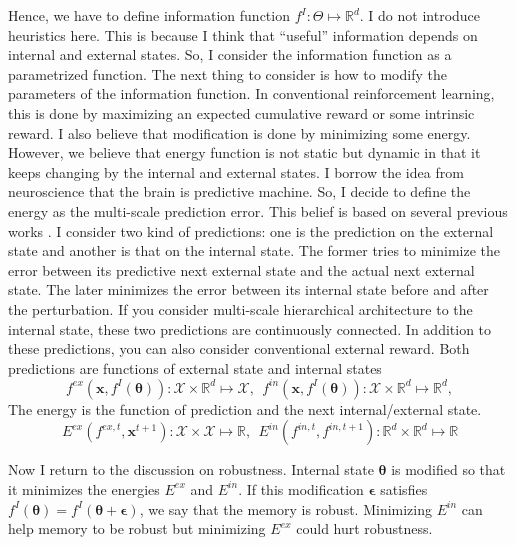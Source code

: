 \documentclass[12pt]{article}
\begin{document}
Hence, we have to define information function $f^I: \Theta \mapsto \mathbb{R}^d$. I do not introduce heuristics here. 
This is because I think that ``useful'' information depends on internal and external states. So, I consider 
the information function as a parametrized function. The next thing to consider is how to modify the parameters of 
the information function. In conventional reinforcement learning, this is done by maximizing an expected cumulative reward or 
some intrinsic reward. I also believe that modification is done by minimizing some energy. However, we believe that 
energy function is not static but dynamic in that it keeps changing by the internal and external states. 
I borrow the idea from neuroscience that the brain is predictive machine. So, I decide to define the energy as the 
 multi-scale prediction error. This belief is based on several previous works \cite{Schmidhuber10,Friston10,Hawkings04}. 
 I consider two kind of predictions: one is the prediction on the external state and another is that on the internal state. 
 The former tries to minimize the error between its predictive next external state and the actual next external state. 
 The later minimizes the error between its internal state before and after the perturbation. If you consider multi-scale hierarchical 
 architecture to the internal state, these two predictions are continuously connected. In addition to these predictions, you can also consider 
 conventional external reward. Both predictions are functions of external state and internal states
 \begin{equation}
     f^{ex}(\bm{x}, f^I(\bm{\theta})): \mathcal{X} \times \mathbb{R}^d \mapsto \mathcal{X}, \ \ f^{in}(\bm{x}, f^I(\bm{\theta})): \mathcal{X} \times \mathbb{R}^d \mapsto \mathbb{R}^d,
 \end{equation}
 The energy is the function of prediction and the next internal/external state.
 \begin{equation}
     E^{ex}(f^{ex, t}, \bm{x}^{t + 1}): \mathcal{X} \times \mathcal{X} \mapsto \mathbb{R}, \ \ E^{in}(f^{in, t}, f^{in, t + 1}): \mathbb{R}^d \times \mathbb{R}^d \mapsto \mathbb{R}
 \end{equation}

 Now I return to the discussion on robustness. Internal state $\bm{\theta}$ is modified so that it minimizes the 
 energies $E^{ex}$ and $E^{in}$. If this modification $\bm{\epsilon}$ satisfies $f^I(\bm{\theta}) = f^I(\bm{\theta}+ \bm{\epsilon})$, 
 we say that the memory is robust. Minimizing $E^{in}$ can help memory to be robust but minimizing $E^{ex}$ could 
 hurt robustness.
\end{document}
